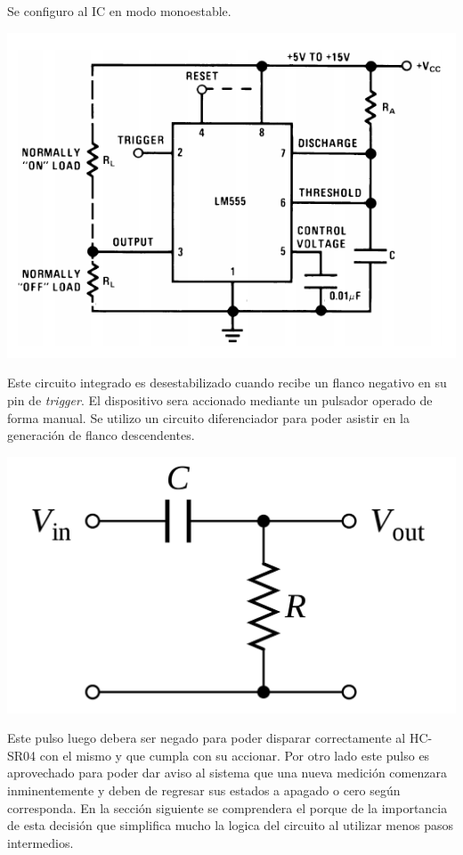 Se configuro al IC en modo monoestable.
\begin{center}
\includegraphics[scale=0.4]{../8-UltraSound/MONO555.png}
\end{center}

Este circuito integrado es desestabilizado cuando recibe un flanco negativo en su pin de \emph{trigger}.
El dispositivo sera accionado mediante un pulsador operado de forma manual. Se utilizo un circuito diferenciador para poder asistir en la generación de flanco descendentes.
\begin{center}
\includegraphics[scale=0.1]{../8-UltraSound/diff.png}
\end{center}

Este pulso luego debera ser negado para poder disparar correctamente al HC-SR04  con el mismo y que cumpla con su  accionar. Por otro lado este pulso es aprovechado para poder dar aviso al sistema que una nueva medición comenzara inminentemente y deben de regresar sus estados a apagado o cero según corresponda. En la sección siguiente se comprendera el porque de la importancia de esta decisión que simplifica mucho la logica del circuito al utilizar menos pasos intermedios.

